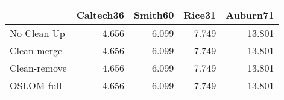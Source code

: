 \begin{tabular}{lrrrr}
\toprule
{} & Caltech36 & Smith60 & Rice31 & Auburn71 \\
\midrule
No Clean Up  &     4.656 &   6.099 &  7.749 &   13.801 \\
Clean-merge  &     4.656 &   6.099 &  7.749 &   13.801 \\
Clean-remove &     4.656 &   6.099 &  7.749 &   13.801 \\
OSLOM-full   &     4.656 &   6.099 &  7.749 &   13.801 \\
\bottomrule
\end{tabular}
